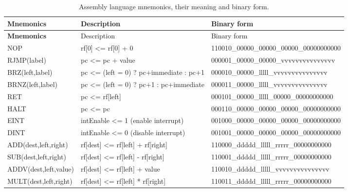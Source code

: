 \begin{table}[H]
\footnotesize
\centering
\begin{longtable}{|l|l|l|}
\caption{Assembly language mnemonics, their meaning and binary form.}
\label{tab:riscISA} \\
\hline
\textbf{Mnemonics} & Description & Binary form \\
\hline
\endfirsthead
\hline
\textbf{Mnemonics} & Description & Binary form \\
\hline
\endhead
\hline
\endfoot
\hline
\endlastfoot
      NOP                       & rf[0] <= rf[0] + 0                            & 110010\_00000\_00000\_00000\_00000000000  \\ \hline
      RJMP(label)               & pc <= pc + value                              & 000001\_00000\_00000\_vvvvvvvvvvvvvvv     \\ \hline
      BRZ(left,label)         & pc <= (left = 0) ? pc+immediate : pc+1          & 000010\_00000\_lllll\_vvvvvvvvvvvvvvv     \\ \hline
      BRNZ(left,label)        & pc <= (left = 0) ?  pc+1 : pc+immediate         & 000011\_00000\_lllll\_vvvvvvvvvvvvvvv     \\ \hline
      RET                       & pc <= rf[left]                                & 000101\_00000\_lllll\_00000\_00000000000  \\ \hline
      HALT                      & pc <= pc                                      & 000110\_00000\_00000\_00000\_00000000000  \\ \hline
      EINT                      & intEnable <= 1 (enable interrupt)             & 001000\_00000\_00000\_00000\_00000000000  \\ \hline
      DINT                      & intEnable <= 0 (disable interrupt)            & 001001\_00000\_00000\_00000\_00000000000  \\ \hline
      ADD(dest,left,right)    & rf[dest] <= rf[left] + rf[right]                & 110000\_ddddd\_lllll\_rrrrr\_00000000000  \\ \hline
      SUB(dest,left,right)    & rf[dest] <= rf[left] - rf[right]                & 110001\_ddddd\_lllll\_rrrrr\_00000000000  \\ \hline
      ADDV(dest,left,value)    & rf[dest] <= rf[left] + value                   & 110010\_ddddd\_lllll\_vvvvvvvvvvvvvvv     \\ \hline
      MULT(dest,left,right)   & rf[dest] <= rf[left] * rf[right]                & 110011\_ddddd\_lllll\_rrrrr\_00000000000  \\ \hline

\end{longtable}
\end{table}
